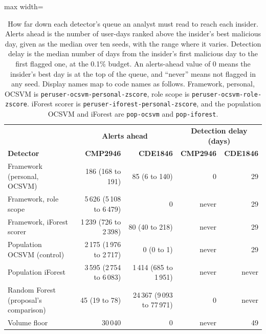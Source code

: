 \documentclass[a4paper,12pt]{article}
\begin{document}
\begin{table}[htbp]
\centering
\caption{How far down each detector's queue an analyst must read to reach each insider. Alerts ahead is the number of user-days ranked above the insider's best malicious day, given as the median over ten seeds, with the range where it varies. Detection delay is the median number of days from the insider's first malicious day to the first flagged one, at the 0.1\% budget. An alerts-ahead value of 0 means the insider's best day is at the top of the queue, and ``never'' means not flagged in any seed. Display names map to code names as follows. Framework, personal, OCSVM is \texttt{peruser-ocsvm-personal-zscore}, role scope is \texttt{peruser-ocsvm-role-zscore}. iForest scorer is \texttt{peruser-iforest-personal-zscore}, and the population OCSVM and iForest are \texttt{pop-ocsvm} and \texttt{pop-iforest}.}
\label{tab:timing}
\footnotesize
\setlength{\tabcolsep}{4pt}
\begin{adjustbox}{max width=\textwidth}
\begin{tabular}{@{}l r r r r@{}}
\toprule
& \multicolumn{2}{c}{\textbf{Alerts ahead}} & \multicolumn{2}{c}{\textbf{Detection delay (days)}} \\
\textbf{Detector} & \textbf{CMP2946} & \textbf{CDE1846} & \textbf{CMP2946} & \textbf{CDE1846} \\
\midrule
Framework (personal, OCSVM)  & 186 (168 to 191) & 85 (6 to 140)          & 0 & 29 \\
Framework, role scope        & 5\,626 (5\,108 to 6\,479) & 0            & never & 29 \\
Framework, iForest scorer    & 1\,239 (726 to 2\,398) & 80 (40 to 218)  & never & 29 \\
Population OCSVM (control)   & 2\,175 (1\,976 to 2\,717) & 0 (0 to 1)   & never & 29 \\
Population iForest           & 3\,595 (2\,754 to 6\,083) & 1\,414 (685 to 1\,951) & never & never \\
Random Forest (proposal's comparison) & 45 (19 to 78) & 24\,367 (9\,093 to 77\,971) & 0 & never \\
Volume floor                 & 30\,040 & 0                         & never & 49 \\
\bottomrule
\end{tabular}
\end{adjustbox}
\end{table}
\end{document}
